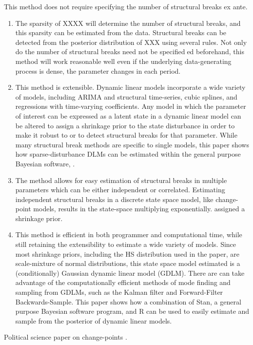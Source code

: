 This method does not require specifying the number of structural breaks ex ante.
\begin{enumerate}
\item The sparsity of XXXX will determine the number of structural breaks, and this sparsity can be estimated from the data.
Structural breaks can be detected from the posterior distribution of XXX using several rules. Not only do
the number of structural breaks need not be specifieded beforehand, this method will work reasonable
well even if the underlying data-generating process is dense, \ie{}the parameter changes in each period.
\item This method is extensible. 
  Dynamic linear models incorporate a wide variety of models, including ARIMA
  and structural time-series, cubic splines, and regressions with time-varying coefficients. Any model in
  which the parameter of interest can be expressed as a latent state in a dynamic linear model can be
  altered to assign a shrinkage prior to the state disturbance in order to make it robust to or to detect
  structural breaks for that parameter. While many structural break methods are specific to single
  models, this paper shows how sparse-disturbance DLMs can be estimated within the general purpose
  Bayesian software, \Stan{}.
\item The method allows for easy estimation of structural breaks in multiple parameters which can be either
independent or correlated. Estimating independent structural breaks in a discrete state space model,
like change-point models, results in the state-space multiplying exponentially.
assigned a shrinkage prior.
\item This method is efficient in both programmer and computational time, while still retaining the extensibility
to estimate a wide variety of models. Since most shrinkage priors, including the HS distribution
used in the paper, are scale-mixture of normal distributions, this state space model estimated is a
(conditionally) Gaussian dynamic linear model (GDLM). There are can take advantage of the computationally
efficient methods of mode finding and sampling from GDLMs, such as the Kalman filter and
Forward-Filter Backwards-Sample. This paper shows how a combination of Stan, a general purpose
Bayesian software program, and R can be used to easily estimate and sample from the posterior of
dynamic linear models.
\end{enumerate}

Political science paper on change-points \parencites{CalderiaZorn1998}{WesternKleykamp2004}{Spirling2007a}{Spirling2007b}{Park2010}{Park2011}{Blackwell2012}.

